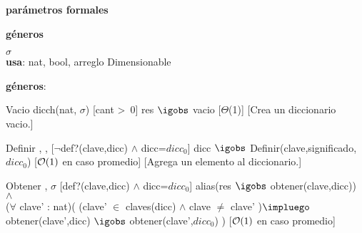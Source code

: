 \begin{Interfaz}

	\textbf{parámetros formales}\parindent\\
	\parbox{1.7cm}{\textbf{géneros}} $\sigma$\\
	
	\textbf{usa}: nat, bool, arreglo Dimensionable
	
	\textbf{géneros}: 
	
	
	\InterfazFuncion
	{Vacio}
	{}
	{dicch(nat, $\sigma$)}
	[cant >\ 0]
	{res $\igobs$ vacio}
	[$\Theta$(1)]
	[Crea un diccionario vacio.]
	
	\InterfazFuncion
	{Definir}
	{, , }
	{}
	[$\neg$def?(clave,dicc) $\land$ dicc=$dicc_0$]
	{dicc $\igobs$ Definir(clave,significado,$dicc_0$)}
	[$\mathcal{O}(1)$ en caso promedio]
	[Agrega un elemento al diccionario.]	
	
	\InterfazFuncion
	{Obtener}
	{, }
	{$\sigma$}
	[def?(clave,dicc) $\land$ dicc=$dicc_0$]
	{alias(res $\igobs$ obtener(clave,dicc)) 
		$\land$\\ 
		($\forall$ clave' : nat)( (clave' $\in$ claves(dicc) $\land$ clave $\neq$ clave' )$\impluego$ obtener(clave',dicc) $\igobs$ obtener(clave',$dicc_0$) )}
	[$\mathcal{O}(1)$ en caso promedio]
	
\end{Interfaz}

